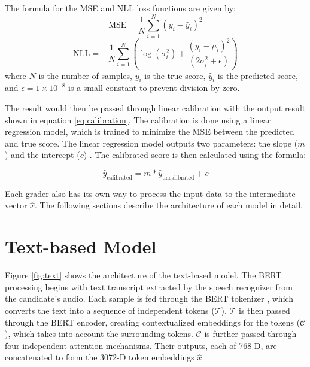 The formula for the MSE and NLL loss functions are given by:
\begin{equation}
    \text{MSE} = \frac{1}{N} \sum_{i=1}^{N} (y_i - \hat{y}_i)^2
\end{equation}
\begin{equation}
    \text{NLL} = -\frac{1}{N} \sum_{i=1}^{N} \left( \log(\sigma_i^2) + \frac{(y_i - \mu_i)^2}{(2\sigma_i^2 + \epsilon)} \right)
\end{equation}
where $N$ is the number of samples, $y_i$ is the true score,  $\hat{y}_i$ is the predicted score, and $\epsilon = 1\times10^{-8}$ is a small constant to prevent division by zero.

The result would then be passed through linear calibration with the output result shown in equation \ref{eq:calibration}. The calibration is done using a linear regression model, which is trained to minimize the MSE between the predicted and true score. The linear regression model outputs two parameters: the slope ($m$)  and the intercept ($c$) . The calibrated score is then calculated using the formula:

\begin{equation}
    \hat{y}_{\text{calibrated}} = m*\hat{y}_{\text{uncalibrated}} + c
    \label{eq:calibration}
\end{equation}

Each grader also has its own way to process the input data to the intermediate vector $\hat{x}$. The following sections describe the architecture of each model in detail.

\section{Text-based Model}
Figure \ref{fig:text} shows the architecture of the text-based model. The BERT processing begins with text transcript extracted by the speech recognizer from the candidate's audio. Each sample is fed through the BERT tokenizer , which converts the text into a sequence of independent tokens ($\mathcal{T}$). $\mathcal{T}$ is then passed through the BERT encoder, creating contextualized embeddings for the tokens ($\mathcal{C}$), which takes into account the surrounding tokens. $\mathcal{C}$ is further passed through four independent attention mechanisms. Their outputs, each of 768-D, are concatenated to form the 3072-D token embeddings $\hat{x}$.

